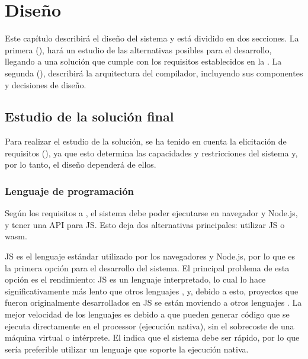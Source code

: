 \chapter{Diseño}\label{chap:design}

Este capítulo describirá el diseño del sistema y está dividido en dos
secciones. La primera (), hará un estudio de las
alternativas posibles para el desarrollo, llegando a una solución que cumple con
los requisitos establecidos en la . La segunda
(), describirá la arquitectura del compilador,
incluyendo sus componentes y decisiones de diseño.

\section{Estudio de la solución final}\label{sec:solution_study}

Para realizar el estudio de la solución, se ha tenido en cuenta la elicitación
de requisitos (), ya que esto determina las capacidades
y restricciones del sistema y, por lo tanto, el diseño dependerá de ellos.

\subsection{Lenguaje de programación}\label{subsec:language}

Según los requisitos  a , el sistema
debe poder ejecutarse en navegador y Node.js, y tener una \gls{API} para
\gls{JS}. Esto deja dos alternativas principales: utilizar \gls{JS} o
\gls{wasm}.

\gls{JS} es el lenguaje estándar utilizado por los navegadores y Node.js, por lo
que es la primera opción para el desarrollo del sistema. El principal problema
de esta opción es el rendimiento: \gls{JS} es un lenguaje interpretado, lo cual
lo hace significativamente más lento que otros lenguajes
, y, debido a esto, proyectos que fueron
originalmente desarrollados en \gls{JS} se están moviendo a otros lenguajes
\parencite{typescript-go}. La mejor velocidad de los lenguajes
 es debido a que pueden generar código que se
ejecuta directamente en el \gls{processor} (ejecución nativa), sin el sobrecoste
de una máquina virtual o intérprete. El  indica que el
sistema debe ser rápido, por lo que sería preferible utilizar un lenguaje que
soporte la ejecución nativa.

